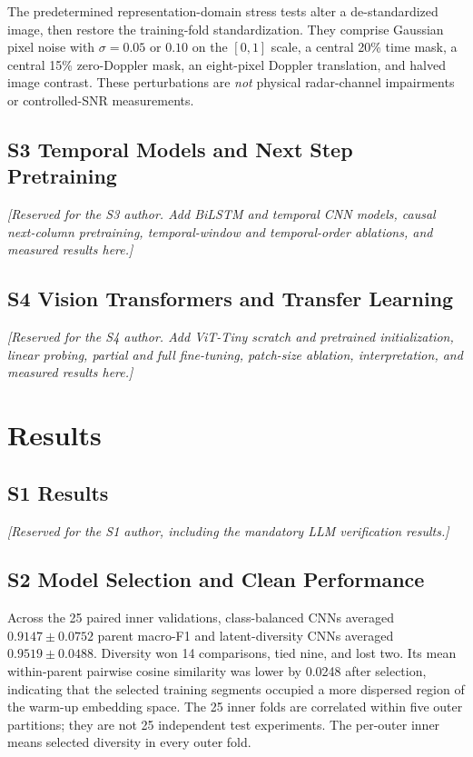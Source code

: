\IfFileExists{IEEEtran.cls}{\ieeetrue\documentclass[conference]{IEEEtran}}{\ieeefalse\documentclass[10pt,twocolumn,letterpaper]{article}}
\begin{document}
The predetermined representation-domain stress tests alter a de-standardized image, then restore the training-fold standardization. They comprise Gaussian pixel noise with $\sigma=0.05$ or $0.10$ on the $[0,1]$ scale, a central 20\% time mask, a central 15\% zero-Doppler mask, an eight-pixel Doppler translation, and halved image contrast. These perturbations are \emph{not} physical radar-channel impairments or controlled-SNR measurements.

\subsection{S3 Temporal Models and Next Step Pretraining}
\textit{[Reserved for the S3 author. Add BiLSTM and temporal CNN models, causal next-column pretraining, temporal-window and temporal-order ablations, and measured results here.]}

\subsection{S4 Vision Transformers and Transfer Learning}
\textit{[Reserved for the S4 author. Add ViT-Tiny scratch and pretrained initialization, linear probing, partial and full fine-tuning, patch-size ablation, interpretation, and measured results here.]}

\section{Results}
\subsection{S1 Results}
\textit{[Reserved for the S1 author, including the mandatory LLM verification results.]}

\subsection{S2 Model Selection and Clean Performance}
Across the 25 paired inner validations, class-balanced CNNs averaged $0.9147\pm0.0752$ parent macro-F1 and latent-diversity CNNs averaged $0.9519\pm0.0488$. Diversity won 14 comparisons, tied nine, and lost two. Its mean within-parent pairwise cosine similarity was lower by 0.0248 after selection, indicating that the selected training segments occupied a more dispersed region of the warm-up embedding space. The 25 inner folds are correlated within five outer partitions; they are not 25 independent test experiments. The per-outer inner means selected diversity in every outer fold.
\end{document}
